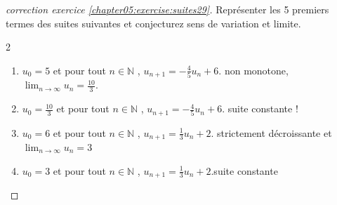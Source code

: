 \documentclass[main.tex]{subfiles}
\begin{document}
\begin{proof}[correction exercice \ref{chapter05:exercise:suites29}]	Représenter les 5 premiers termes des suites suivantes et conjecturez sens de variation et limite.
	\vspace{-1.5em}
\begin{multicols}{2}
\begin{enumerate}[label=\arabic*),leftmargin=*]  
	\item  $u_0=5$ et pour tout $n\in\mathbb{N}$ , $u_{n+1}=-\tfrac{4}{5}u_n+6$. \colorbox{BurntOrange}{non monotone, $\lim_{n\to\infty}u_n=\frac{10}{3}$}.
	\item  $u_0=\tfrac{10}{3}$ et pour tout $n\in\mathbb{N}$ , $u_{n+1}=-\tfrac{4}{5}u_n+6$. \colorbox{BurntOrange}{suite constante !}
	\item  $u_0=6$ et pour tout $n\in\mathbb{N}$ , $u_{n+1}= \tfrac{1}{3}u_n+2$. \colorbox{BurntOrange}{strictement décroissante et $\lim_{n\to\infty}u_n=3$}
	\item  $u_0=3$ et pour tout $n\in\mathbb{N}$ , $u_{n+1}= \tfrac{1}{3}u_n+2$.\colorbox{BurntOrange}{suite constante}
\end{enumerate}
	\end{multicols} 
\end{proof}
\end{document}
